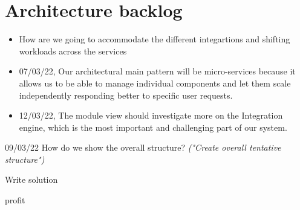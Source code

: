 \documentclass[10pt]{article}
\newcommand{\cmark}{\ding{51}}%
\newcommand{\xmark}{\ding{55}}%
\newcommand{\done}{\rlap{$\square$}{\raisebox{2pt}{\large\hspace{1pt}\cmark}}%
\hspace{-2.5pt}}
\newcommand{\wontfix}{\rlap{$\square$}{\large\hspace{1pt}\xmark}}
\begin{document}
\section{Architecture backlog}
\begin{itemize}
    \item How are we going to accommodate the different integartions and shifting workloads across the services
    \item 07/03/22, Our architectural main pattern will be micro-services because it allows us to be able to manage individual components and let them scale independently responding better to specific user requests. 
    \item 12/03/22, The module view should investigate more on the Integration engine, which is the most important and challenging part of our system.
\end{itemize}


\begin{itemize}
  \begin{todolist}
  \item [09/03/22] How do we show the overall structure? \textit{("Create overall tentative structure")}
  \item Write solution
  \item profit
  \end{todolist}
\end{itemize}
\end{document}

